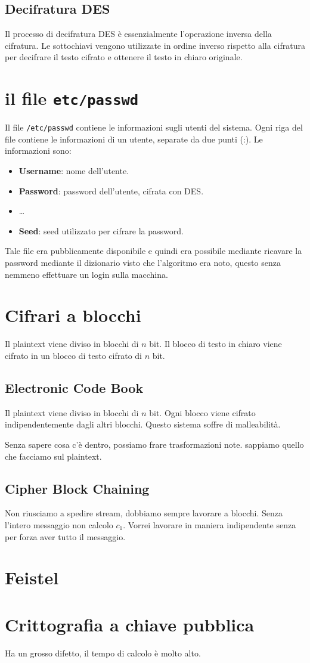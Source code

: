 \subsection{Decifratura DES}
Il processo di decifratura DES è essenzialmente l'operazione inversa della
cifratura. Le sottochiavi vengono utilizzate in ordine inverso rispetto alla
cifratura per decifrare il testo cifrato e ottenere il testo in chiaro originale.
\section{il file \texttt{etc/passwd}}
Il file \verb|/etc/passwd| contiene le informazioni sugli utenti del sistema.
Ogni riga del file contiene le informazioni di un utente, separate da due punti
(:). Le informazioni sono:
\begin{itemize}
    \item \textbf{Username}: nome dell'utente.
    \item \textbf{Password}: password dell'utente, cifrata con DES.
    \item \dots
    \item \textbf{Seed}: seed utilizzato per cifrare la password.
\end{itemize}
Tale file era pubblicamente disponibile e quindi era possibile mediante ricavare 
la password mediante il dizionario visto che l'algoritmo era noto, questo senza
nemmeno effettuare un login sulla macchina.
\section{Cifrari a blocchi}
Il plaintext viene diviso in blocchi di $n$ bit. Il blocco di testo in chiaro viene
cifrato in un blocco di testo cifrato di $n$ bit.
\subsection{Electronic Code Book}
Il plaintext viene diviso in blocchi di $n$ bit. Ogni blocco viene cifrato
indipendentemente dagli altri blocchi. Questo sistema soffre di malleabilità.


Senza sapere cosa c'è dentro, possiamo frare trasformazioni note. sappiamo quello che facciamo sul
plaintext.
\subsection{Cipher Block Chaining}
Non riusciamo a spedire stream, dobbiamo sempre lavorare a blocchi. Senza l'intero messaggio 
non calcolo $c_1$. Vorrei lavorare in maniera indipendente senza per forza aver tutto il messaggio.

\section{Feistel}
\section{Crittografia a chiave pubblica}
Ha un grosso difetto, il tempo di calcolo è molto alto.
